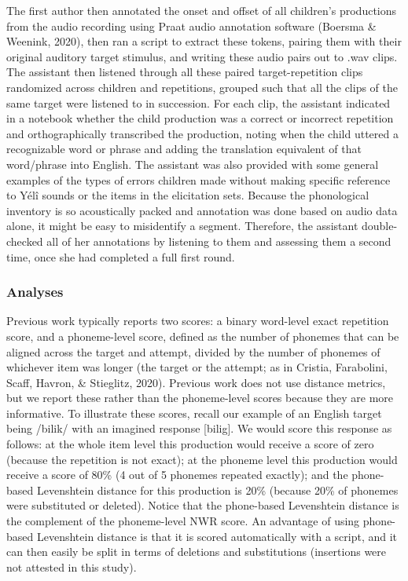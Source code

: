 \documentclass[
  american,
  ,man,floatsintext]{apa6}
\begin{document}
The first author then annotated the onset and offset of all children's productions from the audio recording using Praat audio annotation software (Boersma \& Weenink, 2020), then ran a script to extract these tokens, pairing them with their original auditory target stimulus, and writing these audio pairs out to .wav clips. The assistant then listened through all these paired target-repetition clips randomized across children and repetitions, grouped such that all the clips of the same target were listened to in succession. For each clip, the assistant indicated in a notebook whether the child production was a correct or incorrect repetition and orthographically transcribed the production, noting when the child uttered a recognizable word or phrase and adding the translation equivalent of that word/phrase into English. The assistant was also provided with some general examples of the types of errors children made without making specific reference to Yélî sounds or the items in the elicitation sets. Because the phonological inventory is so acoustically packed and annotation was done based on audio data alone, it might be easy to misidentify a segment. Therefore, the assistant double-checked all of her annotations by listening to them and assessing them a second time, once she had completed a full first round.

\hypertarget{analyses}{%
\subsubsection{Analyses}\label{analyses}}

Previous work typically reports two scores: a binary word-level exact repetition score, and a phoneme-level score, defined as the number of phonemes that can be aligned across the target and attempt, divided by the number of phonemes of whichever item was longer (the target or the attempt; as in Cristia, Farabolini, Scaff, Havron, \& Stieglitz, 2020). Previous work does not use distance metrics, but we report these rather than the phoneme-level scores because they are more informative. To illustrate these scores, recall our example of an English target being /bilik/ with an imagined response {[}bilig{]}. We would score this response as follows: at the whole item level this production would receive a score of zero (because the repetition is not exact); at the phoneme level this production would receive a score of 80\% (4 out of 5 phonemes repeated exactly); and the phone-based Levenshtein distance for this production is 20\% (because 20\% of phonemes were substituted or deleted). Notice that the phone-based Levenshtein distance is the complement of the phoneme-level NWR score. An advantage of using phone-based Levenshtein distance is that it is scored automatically with a script, and it can then easily be split in terms of deletions and substitutions (insertions were not attested in this study).
\end{document}

